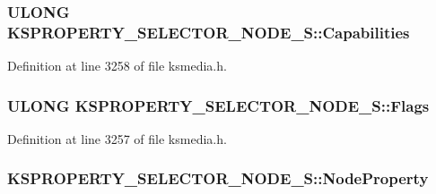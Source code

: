 \subsubsection[{\texorpdfstring{Capabilities}{Capabilities}}]{\setlength{\rightskip}{0pt plus 5cm}U\+L\+O\+NG K\+S\+P\+R\+O\+P\+E\+R\+T\+Y\+\_\+\+S\+E\+L\+E\+C\+T\+O\+R\+\_\+\+N\+O\+D\+E\+\_\+\+S\+::\+Capabilities}\hypertarget{struct_k_s_p_r_o_p_e_r_t_y___s_e_l_e_c_t_o_r___n_o_d_e___s_aaf1f682ce4a8e157a64a81cbde0365b6}{}\label{struct_k_s_p_r_o_p_e_r_t_y___s_e_l_e_c_t_o_r___n_o_d_e___s_aaf1f682ce4a8e157a64a81cbde0365b6}


Definition at line 3258 of file ksmedia.\+h.

\subsubsection[{\texorpdfstring{Flags}{Flags}}]{\setlength{\rightskip}{0pt plus 5cm}U\+L\+O\+NG K\+S\+P\+R\+O\+P\+E\+R\+T\+Y\+\_\+\+S\+E\+L\+E\+C\+T\+O\+R\+\_\+\+N\+O\+D\+E\+\_\+\+S\+::\+Flags}\hypertarget{struct_k_s_p_r_o_p_e_r_t_y___s_e_l_e_c_t_o_r___n_o_d_e___s_a269a690f1564bf0cb333ae4ae4221dbc}{}\label{struct_k_s_p_r_o_p_e_r_t_y___s_e_l_e_c_t_o_r___n_o_d_e___s_a269a690f1564bf0cb333ae4ae4221dbc}


Definition at line 3257 of file ksmedia.\+h.

\subsubsection[{\texorpdfstring{Node\+Property}{NodeProperty}}]{ K\+S\+P\+R\+O\+P\+E\+R\+T\+Y\+\_\+\+S\+E\+L\+E\+C\+T\+O\+R\+\_\+\+N\+O\+D\+E\+\_\+\+S\+::\+Node\+Property}\hypertarget{struct_k_s_p_r_o_p_e_r_t_y___s_e_l_e_c_t_o_r___n_o_d_e___s_a7085b678e1cf47167124c3824cb311c6}{}\label{struct_k_s_p_r_o_p_e_r_t_y___s_e_l_e_c_t_o_r___n_o_d_e___s_a7085b678e1cf47167124c3824cb311c6}


